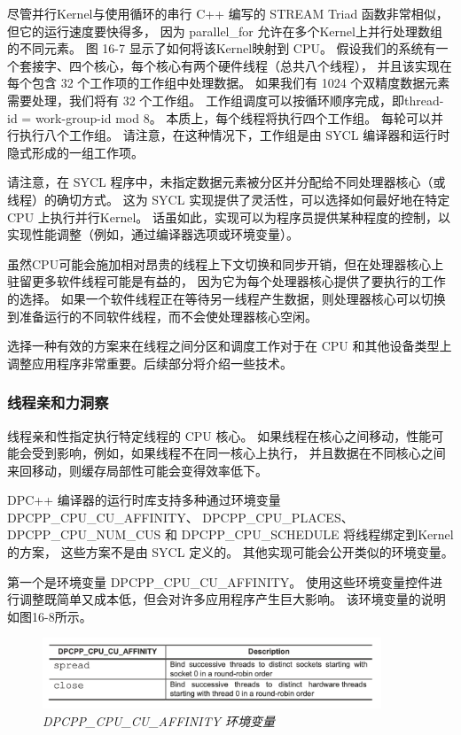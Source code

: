 尽管并行Kernel与使用循环的串行 C++ 编写的 STREAM Triad 函数非常相似，但它的运行速度要快得多，
因为 parallel\_for 允许在多个Kernel上并行处理数组的不同元素。 
图 16-7 显示了如何将该Kernel映射到 CPU。 
假设我们的系统有一个套接字、四个核心，每个核心有两个硬件线程（总共八个线程），
并且该实现在每个包含 32 个工作项的工作组中处理数据。 
如果我们有 1024 个双精度数据元素需要处理，我们将有 32 个工作组。 
工作组调度可以按循环顺序完成，即thread-id = work-group-id mod 8。
本质上，每个线程将执行四个工作组。 每轮可以并行执行八个工作组。 
请注意，在这种情况下，工作组是由 SYCL 编译器和运行时隐式形成的一组工作项。

请注意，在 SYCL 程序中，未指定数据元素被分区并分配给不同处理器核心（或线程）的确切方式。 
这为 SYCL 实现提供了灵活性，可以选择如何最好地在特定 CPU 上执行并行Kernel。 
话虽如此，实现可以为程序员提供某种程度的控制，以实现性能调整（例如，通过编译器选项或环境变量）。

虽然CPU可能会施加相对昂贵的线程上下文切换和同步开销，但在处理器核心上驻留更多软件线程可能是有益的，
因为它为每个处理器核心提供了要执行的工作的选择。 
如果一个软件线程正在等待另一线程产生数据，则处理器核心可以切换到准备运行的不同软件线程，而不会使处理器核心空闲。

\begin{remark}[选择如何绑定和调度线程]
选择一种有效的方案来在线程之间分区和调度工作对于在 CPU 和其他设备类型上调整应用程序非常重要。后续部分将介绍一些技术。
\end{remark}

\subsubsection{线程亲和力洞察}
线程亲和性指定执行特定线程的 CPU 核心。 
如果线程在核心之间移动，性能可能会受到影响，例如，如果线程不在同一核心上执行，
并且数据在不同核心之间来回移动，则缓存局部性可能会变得效率低下。

DPC++ 编译器的运行时库支持多种通过环境变量 DPCPP\_CPU\_CU\_AFFINITY、
DPCPP\_CPU\_PLACES、DPCPP\_CPU\_NUM\_CUS 和 DPCPP\_CPU\_SCHEDULE 将线程绑定到Kernel的方案，
这些方案不是由 SYCL 定义的。 
其他实现可能会公开类似的环境变量。

第一个是环境变量 DPCPP\_CPU\_CU\_AFFINITY。 
使用这些环境变量控件进行调整既简单又成本低，但会对许多应用程序产生巨大影响。 该环境变量的说明如图16-8所示。

\begin{figure}[H]
	\centering
	\includegraphics[width=0.9\textwidth]{figs/F16.8.png}
	\caption{\textit{DPCPP\_CPU\_CU\_AFFINITY 环境变量 }}
\end{figure}

